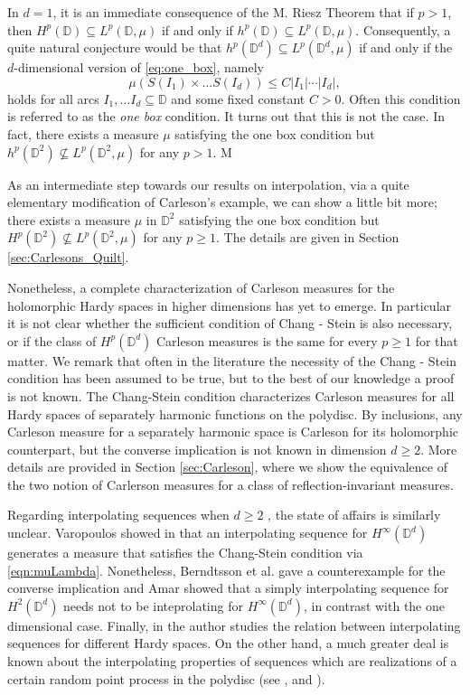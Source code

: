 \documentclass{amsart}
\numberwithin{equation}{section}
\newcommand{\D}{\mathbb{D}}
\begin{document}
In $d=1$, it is an immediate consequence of the M. Riesz Theorem that if $p>1$, then 
$H^p(\mathbb{D}) \subseteq L^p(\mathbb{D},\mu)$ if and only if $h^p(\mathbb{D}) \subseteq L^p(\mathbb{D},\mu)$.  
Consequently, a quite natural conjecture would be that $ h^p(\mathbb{D}^d) \subseteq L^p(\mathbb{D}^d,\mu) $ if and only if the $d$-dimensional version of \eqref{eq:one_box}, namely
\[ \mu(S(I_1)\times \dots S(I_d)) \leq C |I_1| \cdots |I_d|, \]
holds for all arcs $I_1,\dots I_d \subseteq \mathbb{D}$ and some fixed constant $C>0.$ 
Often this condition is referred to as the {\it one box} condition. 
It turns out that this is not the case. In fact, there exists a measure $\mu$ satisfying the one box condition but $ h^p(\mathbb{D}^2) \not \subseteq L^p(\mathbb{D}^2,\mu) $ for any $p>1$. M

As an intermediate step towards our results on interpolation, via a quite elementary 
modification of Carleson's example, we can show a little bit more; there exists a measure $\mu$ in $\mathbb{D}^2$  satisfying the one box condition but $H^p(\mathbb{D}^2) \not \subseteq L^p(\mathbb{D}^2,\mu)$ for any $p\geq 1$. 
The details are given in Section \ref{sec:Carlesons_Quilt}.  

Nonetheless, a complete characterization of Carleson measures for the holomorphic Hardy spaces in higher dimensions has yet to emerge. 
In particular it is not clear whether the sufficient condition of Chang - Stein \cite{Chang1979} is also necessary, or if the class of $H^p(\mathbb{D}^d)$ Carleson measures is the same for every $p\geq 1$ for that matter. We remark that often in the literature the necessity of the Chang - Stein condition has been assumed to be true, but to the best of our knowledge a proof is not known. The Chang-Stein condition characterizes Carleson measures for all Hardy spaces of separately harmonic functions on the polydisc. By inclusions, any Carleson measure for a separately harmonic space is Carleson for its holomorphic counterpart, but the converse implication is not known in dimension $d\ge2$. More details are provided in Section \ref{sec:Carleson}, where we show the equivalence of the two notion of Carlerson measures for a class of reflection-invariant measures.

Regarding interpolating sequences when $d\geq 2$ , the state of affairs is similarly unclear. Varopoulos showed in \cite{Varopoulos72} that an interpolating sequence for $H^\infty(\D^d)$ generates a measure that satisfies the Chang-Stein condition via \eqref{eqn:muLambda}. Nonetheless, Berndtsson et al. \cite{Berndtsson1987} gave a counterexample for the converse implication and Amar \cite{Amar80} showed  that a simply interpolating sequence for $H^2(\D^d)$ needs not to be inteprolating for $H^\infty(\D^d)$, in contrast with the one dimensional case. Finally, in \cite{Amar07} the author studies the relation between interpolating sequences for different Hardy spaces.
On the other hand, a much greater deal is known about the interpolating properties of sequences which are realizations of a certain random point process in the polydisc (see \cite{Dayan2023}, \cite{Chalmoukis2024} and \cite{Chalmoukis2022}). 
\end{document}
